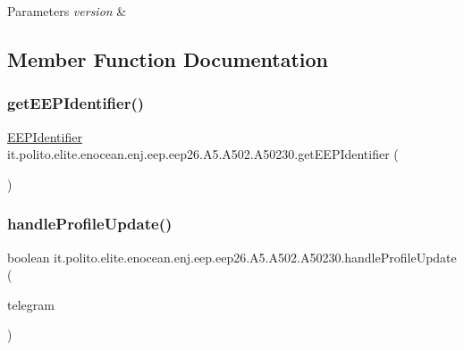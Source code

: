 \begin{DoxyParams}{Parameters}
{\em version} & \\
\hline
\end{DoxyParams}


\subsection{Member Function Documentation}
\hypertarget{classit_1_1polito_1_1elite_1_1enocean_1_1enj_1_1eep_1_1eep26_1_1_a5_1_1_a502_1_1_a50230_a4bbd2e1eee17a112c29e78588b56d059}{}\label{classit_1_1polito_1_1elite_1_1enocean_1_1enj_1_1eep_1_1eep26_1_1_a5_1_1_a502_1_1_a50230_a4bbd2e1eee17a112c29e78588b56d059} 
\subsubsection{\texorpdfstring{get\+E\+E\+P\+Identifier()}{getEEPIdentifier()}}
{\footnotesize\ttfamily \hyperlink{classit_1_1polito_1_1elite_1_1enocean_1_1enj_1_1eep_1_1_e_e_p_identifier}{E\+E\+P\+Identifier} it.\+polito.\+elite.\+enocean.\+enj.\+eep.\+eep26.\+A5.\+A502.\+A50230.\+get\+E\+E\+P\+Identifier (\begin{DoxyParamCaption}{ }\end{DoxyParamCaption})}

\hypertarget{classit_1_1polito_1_1elite_1_1enocean_1_1enj_1_1eep_1_1eep26_1_1_a5_1_1_a502_1_1_a50230_a820065c8a7f3324967022dc62821b727}{}\label{classit_1_1polito_1_1elite_1_1enocean_1_1enj_1_1eep_1_1eep26_1_1_a5_1_1_a502_1_1_a50230_a820065c8a7f3324967022dc62821b727} 
\subsubsection{\texorpdfstring{handle\+Profile\+Update()}{handleProfileUpdate()}}
{\footnotesize\ttfamily boolean it.\+polito.\+elite.\+enocean.\+enj.\+eep.\+eep26.\+A5.\+A502.\+A50230.\+handle\+Profile\+Update (\begin{DoxyParamCaption}\item[{\hyperlink{classit_1_1polito_1_1elite_1_1enocean_1_1enj_1_1eep_1_1eep26_1_1telegram_1_1_e_e_p26_telegram}{E\+E\+P26\+Telegram}}]{telegram }\end{DoxyParamCaption})}



